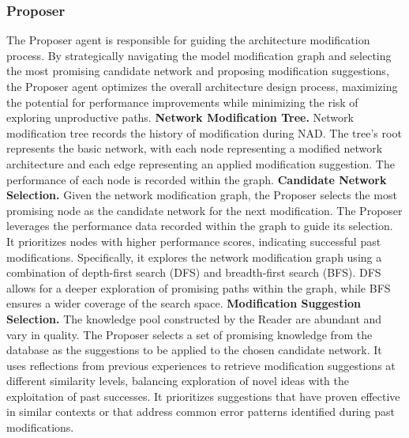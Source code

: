\subsubsection{Proposer}
The Proposer agent is responsible for guiding the architecture modification process.
By strategically navigating the model modification graph and selecting the most promising candidate network and proposing modification suggestions, the Proposer agent optimizes the overall architecture design process, maximizing the potential for performance improvements while minimizing the risk of exploring unproductive paths.
\textbf{Network Modification Tree.} 
Network modification tree records the history of modification during NAD. The tree's root represents the basic network, with each node representing a modified network architecture and each edge representing an applied modification suggestion. The performance of each node is recorded within the graph.
\textbf{Candidate Network Selection.} Given the network modification graph, the Proposer selects the most promising node as the candidate network for the next modification. The Proposer leverages the performance data recorded within the graph to guide its selection. It prioritizes nodes with higher performance scores, indicating successful past modifications. 
Specifically, it explores the network modification graph using a combination of depth-first search (DFS) and breadth-first search (BFS). DFS allows for a deeper exploration of promising paths within the graph, while BFS ensures a wider coverage of the search space.
\textbf{Modification Suggestion Selection.} 
The knowledge pool constructed by the Reader are abundant and vary in quality. The Proposer selects a set of promising knowledge from the database as the suggestions to be applied to the chosen candidate network. 
It uses reflections from previous experiences to retrieve modification suggestions at different similarity levels, balancing exploration of novel ideas with the exploitation of past successes. It prioritizes suggestions that have proven effective in similar contexts or that address common error patterns identified during past modifications.

